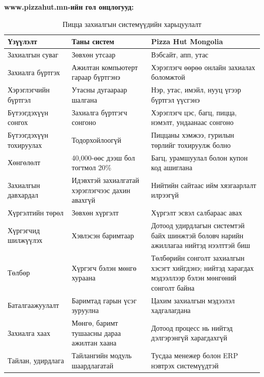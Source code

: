 \textbf{www.pizzahut.mn-ийн гол онцлогууд:}
\begin{table}
    \centering
    \begin{tabular}{p{4cm}p{4.5cm}p{5.5cm}}
        \toprule
\textbf{Үзүүлэлт} &
\textbf{Таны систем} &
\textbf{Pizza Hut Mongolia} \\
\midrule

Захиалгын суваг &
Зөвхөн утсаар &
Вэбсайт, апп, утас \\

Захиалга бүртгэх &
Ажилтан компьютерт гараар бүртгэнэ &
Хэрэглэгч өөрөө онлайн захиалах боломжтой \\

Хэрэглэгчийн бүртгэл &
Утасны дугаараар шалгана &
Нэр, утас, имэйл, нууц үгээр бүртгэл үүсгэнэ \\

Бүтээгдэхүүн сонгох &
Захиалга бүртгэгч сонгоно &
Хэрэглэгч цэс, багц, пицца, нэмэлт, ундаанаас сонгоно \\

Бүтээгдэхүүн тохируулах &
Тодорхойлоогүй &
Пиццаны хэмжээ, гурилын төрлийг тохируулж болно \\
Хөнгөлөлт &
40,000-өөс дээш бол тогтмол 20\% &
Багц, урамшуулал болон купон код ашиглана \\

Захиалгын давхардал &
Идэвхтэй захиалгатай хэрэглэгчээс дахин авахгүй &
Нийтийн сайтаас ийм хязгаарлалт илрээгүй \\

Хүргэлтийн төрөл &
Зөвхөн хүргэлт &
Хүргэлт эсвэл салбараас авах \\

Хүргэгчид шилжүүлэх &
Хэвлэсэн баримтаар &
Дотоод удирдлагын системтэй байх шинжтэй боловч нарийн ажиллагаа
нийтэд нээлттэй биш \\
Төлбөр &
Хүргэгч бэлэн мөнгө хураана &
Төлбөрийн сонголт захиалгын хэсэгт хийгдэнэ; нийтэд харагдах
мэдээллээр бэлэн мөнгөний сонголт байна \\

Баталгаажуулалт &
Баримтад гарын үсэг зуруулна &
Цахим захиалгын мэдээлэл хадгалагдана \\

Захиалга хаах &
Мөнгө, баримт тушаасны дараа ажилтан хаана &
Дотоод процесс нь нийтэд дэлгэрэнгүй харагдахгүй \\

Тайлан, удирдлага &
Тайлангийн модуль шаардлагатай &
Тусдаа менежер болон ERP нэвтрэх системүүдтэй \\

\bottomrule

    \end{tabular}
    \caption{Пицца захиалгын системүүдийн харьцуулалт}
    \label{tab:placeholder}
\end{table}

